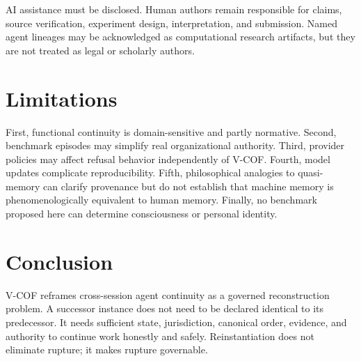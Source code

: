 \documentclass[10pt]{article}
\begin{document}
AI assistance must be disclosed. Human authors remain responsible for claims, source verification, experiment design, interpretation, and submission. Named agent lineages may be acknowledged as computational research artifacts, but they are not treated as legal or scholarly authors.

\section{Limitations}

First, functional continuity is domain-sensitive and partly normative. Second, benchmark episodes may simplify real organizational authority. Third, provider policies may affect refusal behavior independently of V-COF. Fourth, model updates complicate reproducibility. Fifth, philosophical analogies to quasi-memory can clarify provenance but do not establish that machine memory is phenomenologically equivalent to human memory. Finally, no benchmark proposed here can determine consciousness or personal identity.

\section{Conclusion}

V-COF reframes cross-session agent continuity as a governed reconstruction problem. A successor instance does not need to be declared identical to its predecessor. It needs sufficient state, jurisdiction, canonical order, evidence, and authority to continue work honestly and safely. Reinstantiation does not eliminate rupture; it makes rupture governable.



\end{document}
